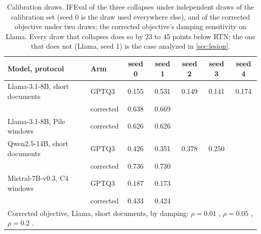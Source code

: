 \begin{table}[htbp]
\caption{Calibration draws. IFEval of the three collapses under independent draws of the calibration set (seed 0 is the draw used everywhere else), and of the corrected objective under two draws; the corrected objective's damping sensitivity on Llama. Every draw that collapses does so by 23 to 45 points below RTN; the one that does not (Llama, seed 1) is the case analyzed in \cref{sec:lesion}.}
\label{tab:seeds}
\begin{center}
\footnotesize
\begin{tabular}{llccccc}
\toprule
Model, protocol & Arm & seed 0 & seed 1 & seed 2 & seed 3 & seed 4 \\
\midrule
Llama-3.1-8B, short documents & GPTQ3 & 0.155 & 0.531 & 0.149 & 0.141 & 0.174 \\
                               & corrected & 0.638 & 0.669 & & & \\
Llama-3.1-8B, Pile windows     & corrected & 0.626 & 0.626 & & & \\
Qwen2.5-14B, short documents   & GPTQ3 & 0.426 & 0.351 & 0.378 & 0.250 & \\
                               & corrected & 0.736 & 0.730 & & & \\
Mistral-7B-v0.3, C4 windows    & GPTQ3 & 0.187 & 0.173 & & & \\
                               & corrected & 0.433 & 0.424 & & & \\
\midrule
\multicolumn{7}{l}{Corrected objective, Llama, short documents, by damping: $\rho=0.01$ \CorrRhoLow{}, $\rho=0.05$ \LcorrIF{}, $\rho=0.2$ \CorrRhoHigh{}.} \\
\bottomrule
\end{tabular}
\end{center}
\end{table}
